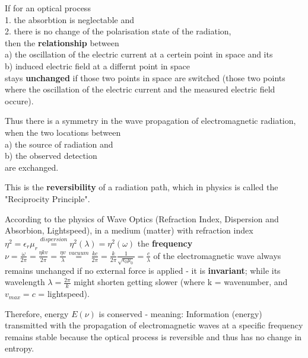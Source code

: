 
If for an optical process \cite{pfeiler_experimentalphysik_Ed1_V4_58} \\
1. the absorbtion is neglectable and \\
2. there is no change of the polarisation state of the radiation, \\
then the \textbf{relationship} between \\
a) the oscillation of the electric current at a certein point in space and its \\
b) induced electric field at a differnt point in space \\
stays \textbf{unchanged} if those two points in space are switched (those two points where the oscillation of the electric current and the measured electric field occure).

Thus there is a symmetry in the wave propagation of electromagnetic radiation, when the two locations between \\
a) the source of radiation and \\
b) the observed detection \\
are exchanged.

This is the \textbf{reversibility} of a radiation path, which in physics is called the "Reciprocity Principle".

According to the physics of Wave Optics (Refraction Index, Dispersion and Absorbion, Lightspeed), in a medium (matter) with refraction index $\eta^2 = \epsilon_r\mu_r 
\stackrel{dispersion}{=} 
\eta^2(\lambda) = \eta^2(\omega)$ the \textbf{frequency } $\nu = \frac{\omega}{2\pi} = \frac{\eta k v}{2\pi} = \frac{\eta v}{\lambda}
\stackrel{vacuum}{=}
 \frac{kc}{2\pi} = \frac{k}{2\pi}\frac{1}{\sqrt{\epsilon_0\mu_0}} = \frac{c}{\lambda} $ of the electromagnetic wave always remains unchanged if no external force is applied - it is \textbf{invariant}; while its wavelength $\lambda = \frac{2\pi}{k} $ might shorten getting slower (where k = wavenumber, and $v_{max}=c$ = lightspeed).

\vspace{5ex}
\begin{hypothesis}
	Therefore, energy $E(\nu)$ is conserved - meaning: Information (energy) transmitted with the propagation of electromagnetic waves at a specific frequency remains stable because the optical process is reversible and thus has no change in entropy.
	\end{hypothesis}
